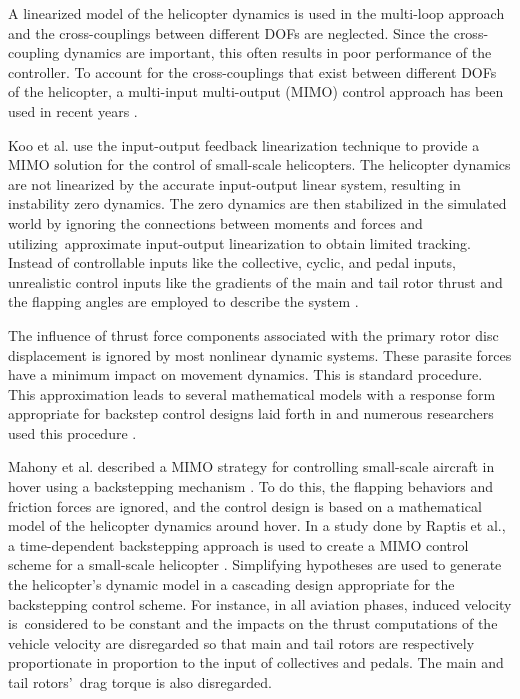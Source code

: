 A linearized model of the helicopter dynamics is used in the multi-loop approach and the cross-couplings between different DOFs are neglected. Since the cross-coupling dynamics are important, this often results in poor performance of the controller. To account for the cross-couplings that exist between different DOFs of the helicopter, a multi-input multi-output (MIMO) control approach has been used in recent years \cite{koo1998output,raptis2009system}. 

 Koo et al. use the input-output feedback linearization technique to provide a MIMO solution for the control of small-scale helicopters. The helicopter dynamics are not linearized by the accurate input-output linear system, resulting in instability zero dynamics. The zero dynamics are then stabilized in the simulated world by ignoring the connections between moments and forces and utilizing approximate input-output linearization to obtain limited tracking. Instead of controllable inputs like the collective, cyclic, and pedal inputs, unrealistic control inputs like the gradients of the main and tail rotor thrust and the flapping angles are employed to describe the system \cite{koo1998output}. 

The influence of thrust force components associated with the primary rotor disc displacement is ignored by most nonlinear dynamic systems. These parasite forces have a minimum impact on movement dynamics. This is standard procedure. This approximation leads to several mathematical models with a response form appropriate for backstep control designs laid forth in \cite{krstic1995nonlinear} and numerous researchers used this procedure \cite{fantoni2002non,azzam2010quad,mahony2004robust}. 

Mahony et al. described a MIMO strategy for controlling small-scale aircraft in hover using a backstepping mechanism \cite{mahony1999hover}. To do this, the flapping behaviors and friction forces are ignored, and the control design is based on a mathematical model of the helicopter dynamics around hover. In a study done by Raptis et al., a time-dependent backstepping approach is used to create a MIMO control scheme for a small-scale helicopter \cite{raptis2009system}. Simplifying hypotheses are used to generate the helicopter's dynamic model in a cascading design appropriate for the backstepping control scheme. For instance, in all aviation phases, induced velocity is considered to be constant and the impacts on the thrust computations of the vehicle velocity are disregarded so that main and tail rotors are respectively proportionate in proportion to the input of collectives and pedals. The main and tail rotors' drag torque is also disregarded.

